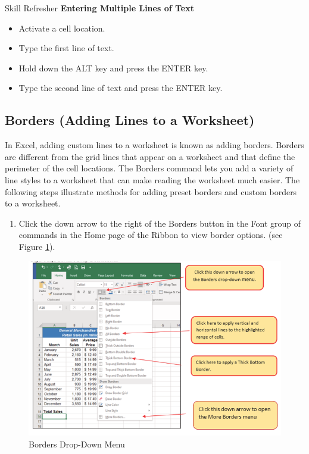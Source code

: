 \begin{center}
	\begin{sklbox}{Skill Refresher}
		\textbf{Entering Multiple Lines of Text}
		\\
		\begin{itemize}
			\setlength{\itemsep}{0pt}
			\setlength{\parskip}{0pt}
			\setlength{\parsep}{0pt}
			
			\item Activate a cell location.
			\item Type the first line of text.
			\item Hold down the ALT key and press the ENTER key.
			\item Type the second line of text and press the ENTER key.
			
		\end{itemize}
	\end{sklbox}
\end{center}

\subsection{Borders (Adding Lines to a Worksheet)}

In Excel, adding custom lines to a worksheet is known as adding borders. Borders are different from the grid lines that appear on a worksheet and that define the perimeter of the cell locations. The Borders command lets you add a variety of line styles to a worksheet that can make reading the worksheet much easier. The following steps illustrate methods for adding preset borders and custom borders to a worksheet.

\begin{enumerate}
	\item Click the down arrow to the right of the Borders button in the Font group of commands in the Home page of the Ribbon to view border options. (see Figure \ref{01:fig42}).
\end{enumerate}

\begin{figure}[H]
	\centering
	\includegraphics[width=\maxwidth{.95\linewidth}]{gfx/ch01_fig42}
	\caption{Borders Drop-Down Menu}
	\label{01:fig42}
\end{figure}


